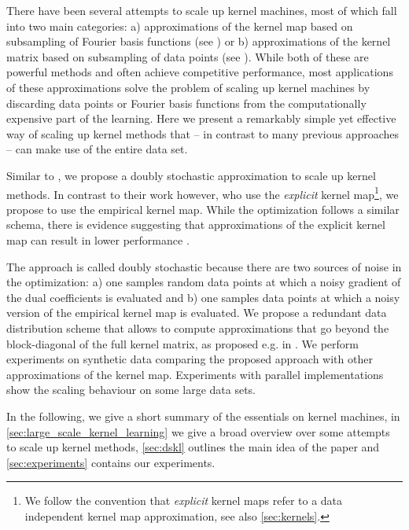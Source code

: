 \documentclass{article} %
\begin{document}
There have been several attempts to scale up kernel machines, most of which fall into two main categories: a) approximations of the kernel map based on subsampling of Fourier basis functions (see \cite{Rahimi2008}) or b) approximations of the kernel matrix based on subsampling of data points (see \cite{Williams2000}).
%
While both of these are powerful methods and often achieve competitive performance, most applications of these approximations solve the problem of scaling up kernel machines by discarding data points or Fourier basis functions from the computationally expensive part of the learning. 
Here we present a remarkably simple yet effective way of scaling up kernel methods that -- in contrast to many previous approaches -- can make use of the entire data set. 

Similar to \cite{Dai2014}, we propose a doubly stochastic approximation to scale up kernel methods. In contrast to their work however, who use the {\em explicit} kernel map\footnote{We follow the convention that {\em explicit} kernel maps refer to a data independent kernel map approximation, see also \autoref{sec:kernels}.}, we propose to use the empirical kernel map. While the optimization follows a similar schema, there is evidence suggesting that approximations of the explicit kernel map can result in lower performance \cite{Yang2012}.

The approach is called doubly stochastic because there are two sources of noise in the optimization: a) one samples random data points at which a noisy gradient of the dual coefficients is evaluated and b) one samples data points at which a noisy version of the empirical kernel map is evaluated. We propose a redundant data distribution scheme that allows to compute approximations that go beyond the block-diagonal of the full kernel matrix, as proposed e.g. in \cite{Deisenroth2015}. We perform experiments on synthetic data comparing the proposed approach with other approximations of the kernel map. Experiments with parallel implementations show the scaling behaviour on some large data sets. 


In the following, we give a short summary of the essentials on kernel machines, in \autoref{sec:large_scale_kernel_learning} we give a broad overview over some attempts to scale up kernel methods, \autoref{sec:dskl} outlines the main idea of the paper and \autoref{sec:experiments} contains our experiments.
\end{document}
